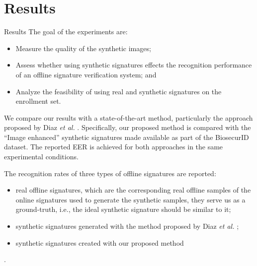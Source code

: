\documentclass{beamer}
\begin{document}
\section{Results}
\begin{frame}{Results}
The goal of the experiments are:
\begin{itemize}
  \item Measure the quality of the synthetic images;
  \item Assess whether using synthetic signatures effects the recognition performance of an offline signature verification system; and
  \item Analyze the feasibility of using real and synthetic signatures
  on the enrollment set.
\end{itemize}

We compare our results with a state-of-the-art method, particularly the approach proposed by Diaz \textit{et al.} \cite{diaz2014generation}. Specifically, our proposed method is compared with the ``Image enhanced'' synthetic signatures made available as part of the BiosecurID \cite{biosecurid} dataset. The reported EER is achieved for both approaches in the same experimental conditions.

The recognition rates of three types of offline signatures are reported: 
\begin{itemize}
  \item real offline signatures, which are the corresponding real offline samples of the online signatures used to generate the synthetic samples, they serve us as a ground-truth, i.e., the ideal synthetic signature should be similar to it;
  \item synthetic signatures generated with the method proposed by Diaz \textit{et al.} \cite{diaz2014generation};
  \item synthetic signatures created with our proposed method
\end{itemize}.
\end{frame}
\end{document}
